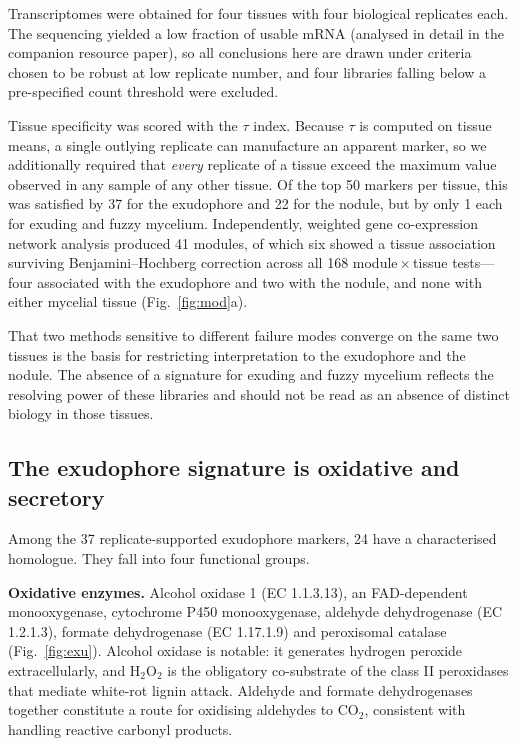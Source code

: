 Transcriptomes were obtained for four tissues with four biological replicates each. The
sequencing yielded a low fraction of usable mRNA (analysed in detail in the companion resource
paper), so all conclusions here are drawn under criteria chosen to be robust at low replicate
number, and four libraries falling below a pre-specified count threshold were excluded.

Tissue specificity was scored with the $\tau$ index. Because $\tau$ is computed on tissue means,
a single outlying replicate can manufacture an apparent marker, so we additionally required
that \emph{every} replicate of a tissue exceed the maximum value observed in any sample of any
other tissue. Of the top 50 markers per tissue, this was satisfied by 37 for the exudophore and
22 for the nodule, but by only 1 each for exuding and fuzzy mycelium. Independently, weighted
gene co-expression network analysis produced 41 modules, of which six showed a tissue
association surviving Benjamini--Hochberg correction across all 168 module\,$\times$\,tissue
tests---four associated with the exudophore and two with the nodule, and none with either
mycelial tissue (Fig.~\ref{fig:mod}a).

That two methods sensitive to different failure modes converge on the same two tissues is the
basis for restricting interpretation to the exudophore and the nodule. The absence of a
signature for exuding and fuzzy mycelium reflects the resolving power of these libraries and
should not be read as an absence of distinct biology in those tissues.

\subsection{The exudophore signature is oxidative and secretory}

Among the 37 replicate-supported exudophore markers, 24 have a characterised homologue. They
fall into four functional groups.

\textbf{Oxidative enzymes.} Alcohol oxidase 1 (EC 1.1.3.13), an FAD-dependent monooxygenase,
cytochrome P450 monooxygenase, aldehyde dehydrogenase (EC 1.2.1.3), formate dehydrogenase
(EC 1.17.1.9) and peroxisomal catalase (Fig.~\ref{fig:exu}). Alcohol oxidase is notable: it generates hydrogen peroxide extracellularly, and
H$_2$O$_2$ is the obligatory co-substrate of the class II peroxidases that mediate white-rot
lignin attack. Aldehyde and formate dehydrogenases together constitute a route for oxidising
aldehydes to CO$_2$, consistent with handling reactive carbonyl products.

